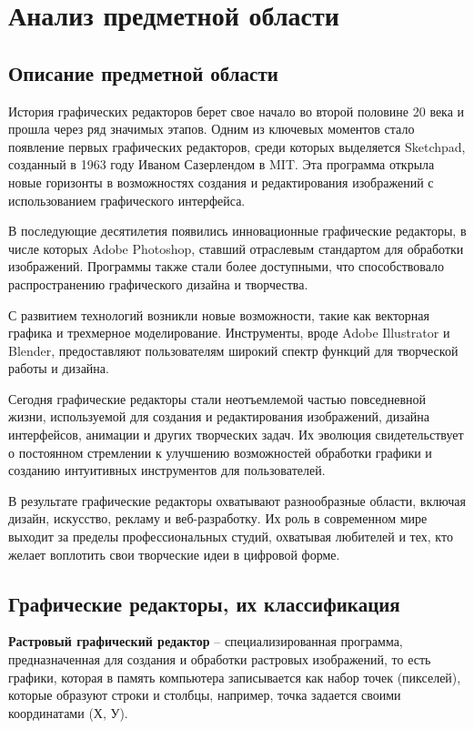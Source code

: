 \section{Анализ предметной области}
\subsection{Описание предметной области}

История графических редакторов берет свое начало во второй половине 20 века и прошла через ряд значимых этапов. Одним из ключевых моментов стало появление первых графических редакторов, среди которых выделяется Sketchpad, созданный в 1963 году Иваном Сазерлендом в MIT. Эта программа открыла новые горизонты в возможностях создания и редактирования изображений с использованием графического интерфейса.

В последующие десятилетия появились инновационные графические редакторы, в числе которых Adobe Photoshop, ставший отраслевым стандартом для обработки изображений. Программы также стали более доступными, что способствовало распространению графического дизайна и творчества.

С развитием технологий возникли новые возможности, такие как векторная графика и трехмерное моделирование. Инструменты, вроде Adobe Illustrator и Blender, предоставляют пользователям широкий спектр функций для творческой работы и дизайна.

Сегодня графические редакторы стали неотъемлемой частью повседневной жизни, используемой для создания и редактирования изображений, дизайна интерфейсов, анимации и других творческих задач. Их эволюция свидетельствует о постоянном стремлении к улучшению возможностей обработки графики и созданию интуитивных инструментов для пользователей.

В результате графические редакторы охватывают разнообразные области, включая дизайн, искусство, рекламу и веб-разработку. Их роль в современном мире выходит за пределы профессиональных студий, охватывая любителей и тех, кто желает воплотить свои творческие идеи в цифровой форме.
\subsection{Графические редакторы, их классификация}

\textbf{Растровый графический редактор} -- специализированная программа, предназначенная для создания и обработки растровых изображений, то есть графики, которая в память компьютера записывается как набор точек (пикселей), которые образуют строки и столбцы, например, точка задается своими координатами (Х, У).


